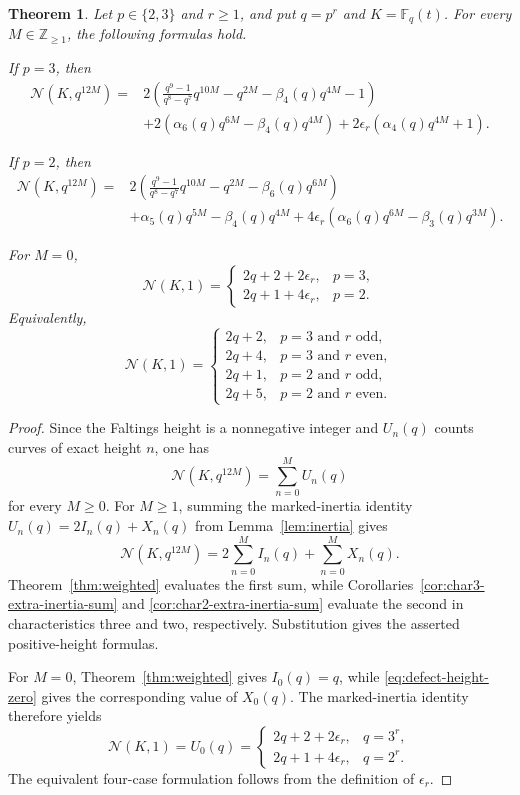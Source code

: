 \documentclass[a4paper,12pt]{amsart}
\newtheorem{thm}{Theorem}[section]
\theoremstyle{definition}
\newcommand{\Zb}{\mathbb{Z}}
\newcommand{\Fb}{\mathbb{F}}
\newcommand{\Nc}{\mathcal{N}}
\begin{document}
\begin{thm}
\label{thm:faltings-height}
Let $p\in\{2,3\}$ and $r\geq1$, and put $q=p^r$ and $K=\Fb_q(t)$.  For every $M\in\Zb_{\geq1}$, the following formulas hold.

If $p=3$, then
\begin{align*}
\Nc(K,q^{12M})
={}&
2\left(
\frac{q^9-1}{q^8-q^7}q^{10M}
-q^{2M}
-\beta_4(q)q^{4M}
-1
\right)\\
&+
2\left(
\alpha_6(q)q^{6M}
-\beta_4(q)q^{4M}
\right)
+
2\epsilon_r\left(
\alpha_4(q)q^{4M}+1
\right).
\end{align*}

If $p=2$, then
\begin{align*}
\Nc(K,q^{12M})
={}&
2\left(
\frac{q^9-1}{q^8-q^7}q^{10M}
-q^{2M}
-\beta_6(q)q^{6M}
\right)\\
&+
\alpha_5(q)q^{5M}
-\beta_4(q)q^{4M}
+
4\epsilon_r\left(
\alpha_6(q)q^{6M}
-\beta_3(q)q^{3M}
\right).
\end{align*}

For $M=0$,
\[
\Nc(K,1)
=
\begin{cases}
2q+2+2\epsilon_r,&p=3,\\
2q+1+4\epsilon_r,&p=2.
\end{cases}
\]
Equivalently,
\[
\Nc(K,1)
=
\begin{cases}
2q+2,&p=3\text{ and }r\text{ odd},\\
2q+4,&p=3\text{ and }r\text{ even},\\
2q+1,&p=2\text{ and }r\text{ odd},\\
2q+5,&p=2\text{ and }r\text{ even}.
\end{cases}
\]
\end{thm}

\begin{proof}
Since the Faltings height is a nonnegative integer and $U_n(q)$ counts curves of exact height $n$, one has
\[
\Nc(K,q^{12M})
=
\sum_{n=0}^M U_n(q)
\]
for every $M\geq0$.  For $M\geq1$, summing the marked-inertia identity $U_n(q)=2I_n(q)+X_n(q)$ from Lemma~\ref{lem:inertia} gives
\[
\Nc(K,q^{12M})
=
2\sum_{n=0}^M I_n(q)
+
\sum_{n=0}^M X_n(q).
\]
Theorem~\ref{thm:weighted} evaluates the first sum, while Corollaries~\ref{cor:char3-extra-inertia-sum} and \ref{cor:char2-extra-inertia-sum} evaluate the second in characteristics three and two, respectively.  Substitution gives the asserted positive-height formulas.

For $M=0$, Theorem~\ref{thm:weighted} gives $I_0(q)=q$, while \eqref{eq:defect-height-zero} gives the corresponding value of $X_0(q)$.  The marked-inertia identity therefore yields
\[
\Nc(K,1)=U_0(q)
=
\begin{cases}
2q+2+2\epsilon_r,&q=3^r,\\
2q+1+4\epsilon_r,&q=2^r.
\end{cases}
\]
The equivalent four-case formulation follows from the definition of $\epsilon_r$.
\end{proof}
\end{document}
